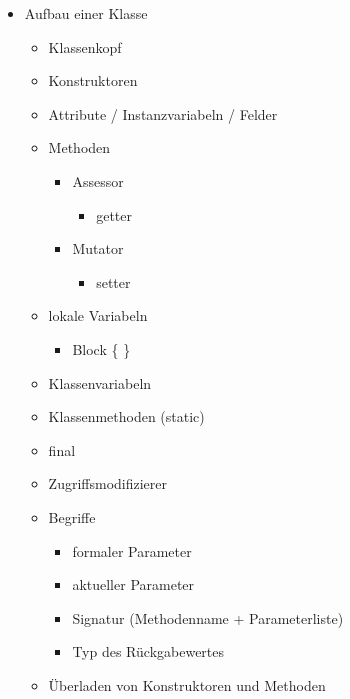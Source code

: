 \begin{itemize}
    \item Aufbau einer Klasse
    \begin{itemize}
        \item Klassenkopf
        \item Konstruktoren
        \item Attribute / Instanzvariabeln / Felder
        \item Methoden
        \begin{itemize}
            \item Assessor
            \begin{itemize}
                \item getter
            \end{itemize}
            \item Mutator
            \begin{itemize}
                \item setter
            \end{itemize}
        \end{itemize}
        \item lokale Variabeln
        \begin{itemize}
            \item Block \{ \}
        \end{itemize}
        \item Klassenvariabeln
        \item Klassenmethoden (static)
        \item final
        \item Zugriffsmodifizierer
        \item Begriffe
        \begin{itemize}
            \item formaler Parameter
            \item aktueller Parameter
            \item Signatur (Methodenname + Parameterliste)
            \item Typ des  Rückgabewertes
        \end{itemize}
        \item Überladen von Konstruktoren und Methoden
    \end{itemize}
    

\end{itemize}
